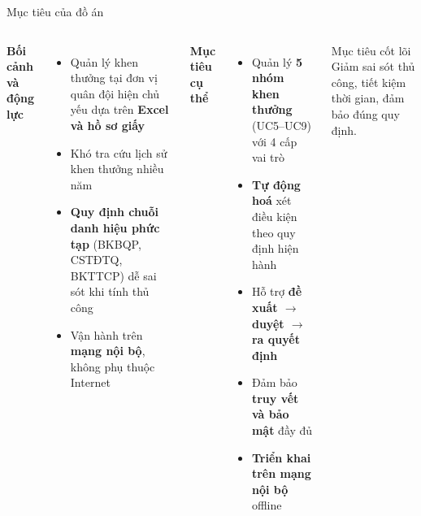 \documentclass[aspectratio=43,xcolor=table]{beamer}
\newcommand{\highlight}[1]{\textcolor{hustred}{\textbf{#1}}}
\begin{document}
\begin{frame}{Mục tiêu của đồ án}
  \begin{columns}[T,onlytextwidth]
    \textbf{Bối cảnh và động lực}
    \begin{itemize}\small
      \item Quản lý khen thưởng tại đơn vị quân đội hiện chủ yếu dựa trên \textbf{Excel và hồ sơ giấy}
      \item Khó tra cứu lịch sử khen thưởng nhiều năm
      \item \highlight{Quy định chuỗi danh hiệu phức tạp} (BKBQP, CSTĐTQ, BKTTCP) dễ sai sót khi tính thủ công
      \item Vận hành trên \textbf{mạng nội bộ}, không phụ thuộc Internet
    \end{itemize}

    \textbf{Mục tiêu cụ thể}
    \begin{itemize}\small
      \item Quản lý \textbf{5 nhóm khen thưởng} (UC5--UC9) với 4 cấp vai trò
      \item \textbf{Tự động hoá} xét điều kiện theo quy định hiện hành
      \item Hỗ trợ \textbf{đề xuất $\to$ duyệt $\to$ ra quyết định}
      \item Đảm bảo \textbf{truy vết và bảo mật} đầy đủ
      \item \textbf{Triển khai trên mạng nội bộ} offline
    \end{itemize}
    \begin{block}{Mục tiêu cốt lõi}
      \small Giảm sai sót thủ công, tiết kiệm thời gian, đảm bảo đúng quy định.
    \end{block}
  \end{columns}
\end{frame}
\end{document}
